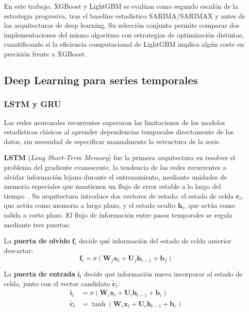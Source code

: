 \documentclass[12pt, a4paper]{article}
\begin{document}
En este trabajo, XGBoost y LightGBM se evalúan como segundo escalón de la estrategia progresiva, tras el baseline estadístico SARIMA/SARIMAX y antes de las arquitecturas de deep learning. Su selección conjunta permite comparar dos implementaciones del mismo algoritmo con estrategias de optimización distintas, cuantificando si la eficiencia computacional de LightGBM implica algún coste en precisión frente a XGBoost.

\subsection{Deep Learning para series temporales}

\subsubsection{LSTM y GRU}

Las redes neuronales recurrentes superaron las limitaciones de los modelos estadísticos clásicos al aprender dependencias temporales directamente de los datos, sin necesidad de especificar manualmente la estructura de la serie.

\textbf{LSTM} (\textit{Long Short-Term Memory}) fue la primera arquitectura en resolver el problema del gradiente evanescente, la tendencia de las redes recurrentes a olvidar información lejana durante el entrenamiento, mediante unidades de memoria especiales que mantienen un flujo de error estable a lo largo del tiempo~\cite{hochreiter1997}. Su arquitectura introduce dos vectores de estado: el estado de celda $\mathbf{c}_t$, que actúa como memoria a largo plazo, y el estado oculto $\mathbf{h}_t$, que actúa como salida a corto plazo. El flujo de información entre pasos temporales se regula mediante tres puertas:

La \textbf{puerta de olvido} $\mathbf{f}_t$ decide qué información del estado de celda anterior descartar:
\begin{equation}
\mathbf{f}_t = \sigma(\mathbf{W}_f \mathbf{x}_t + \mathbf{U}_f \mathbf{h}_{t-1} + \mathbf{b}_f)
\end{equation}

La \textbf{puerta de entrada} $\mathbf{i}_t$ decide qué información nueva incorporar al estado de celda, junto con el vector candidato $\tilde{\mathbf{c}}_t$:
\begin{align}
\mathbf{i}_t &= \sigma(\mathbf{W}_i \mathbf{x}_t + \mathbf{U}_i \mathbf{h}_{t-1} + \mathbf{b}_i) \\
\tilde{\mathbf{c}}_t &= \tanh(\mathbf{W}_c \mathbf{x}_t + \mathbf{U}_c \mathbf{h}_{t-1} + \mathbf{b}_c)
\end{align}
\end{document}
